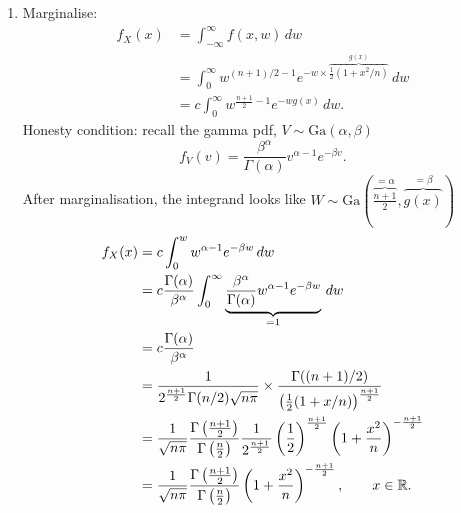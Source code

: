 \documentclass[10pt, a4paper]{article}
\begin{document}
\begin{problem}
\begin{solution}
\begin{enumerate}[label = (\alph*)]
            \item Marginalise:
            \begin{align*}
                f_{X}(x) &= \int_{-\infty}^{\infty}f(x, w)\,dw \\
                &= \int_{0}^{\infty}w ^ {(n + 1) / 2 - 1}e ^ {-w\times\overbrace{\frac{1}{2}(1 + x ^ 2 / n)}^{g(x)}}\,dw \\
                &= c\int_{0}^{\infty}w ^ {\frac{n + 1}{2} - 1}e ^ {-wg(x)}\,dw.
            \end{align*}
            Honesty condition:
            recall the gamma pdf,
            $V \sim \mathrm{Ga}(\alpha, \beta)$
            \[
            f_{V}(v) = \frac{\beta ^ {\alpha}}{\Gamma(\alpha)}v ^ {\alpha - 1}e ^ {-\beta v}.
            \]
            After marginalisation,
            the integrand looks like $W \sim \mathrm{Ga}\left(\overbrace{\frac{n + 1}{2}}^{= \alpha}, \overbrace{g(x)}^{= \beta}\right)$
            \begin{align*}
                f_{X}(x) &= c\int_{0}^{w}w ^ {\alpha - 1}e ^ {-\beta w}\,dw \\
                &= c\frac{\Gamma(\alpha)}{\beta ^ {\alpha}}\int_{0}^{\infty}\underbrace{\frac{\beta ^ {\alpha}}{\Gamma(\alpha)}w ^ {\alpha - 1}e ^ {-\beta w}}_{= 1}\,dw \\
                &= c\frac{\Gamma(\alpha)}{\beta ^ {\alpha}} \\
                &= \frac{1}{2 ^ {\frac{n + 1}{2}}\Gamma(n / 2)\sqrt{n\pi}} \times \frac{\Gamma((n + 1) / 2)}{\left(\frac{1}{2}(1 + x / n)\right) ^ {\frac{n + 1}{2}}} \\
                &= \frac{1}{\sqrt{n\pi}}\frac{\Gamma\left(\frac{n + 1}{2}\right)}{\Gamma\left(\frac{n}{2}\right)}\frac{1}{2 ^ {\frac{n + 1}{2}}}\left(\frac{1}{2}\right) ^ {\frac{n + 1}{2}}\left(1 + \frac{x ^ 2}{n}\right) ^ {-\frac{n + 1}{2}} \\
                &= \frac{1}{\sqrt{n\pi}}\frac{\Gamma\left(\frac{n + 1}{2}\right)}{\Gamma\left(\frac{n}{2}\right)}\left(1 + \frac{x ^ 2}{n}\right) ^ {-\frac{n + 1}{2}},\qquad x \in \mathbb{R}.
            \end{align*}
        \end{enumerate}
    \end{solution}
\end{problem}
\end{document}

